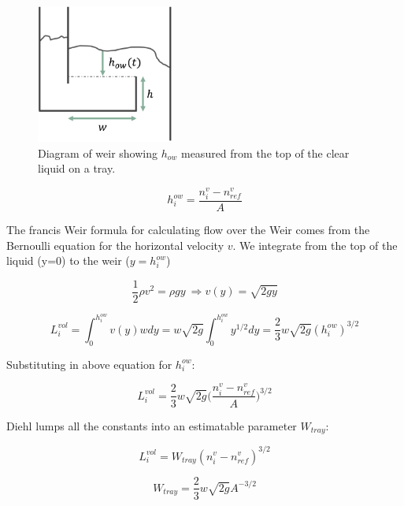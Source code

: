 \begin{figure}
    \centering
    \includegraphics[width=0.4\textwidth]{gfx/Chapter06/weir.png}
    \caption{Diagram of weir showing $h_{ow}$ measured from the top of the clear liquid on a tray.}
    \label{fig:weir}
\end{figure}


\begin{equation}
    h^{ow}_i = \frac{n^v_i-n^v_{ref}}{A}
\end{equation}

The francis Weir formula for calculating flow over the Weir comes from the Bernoulli equation for the horizontal velocity $v$. We integrate from the top of the liquid (y=0) to the weir ($y=h_i^{ow}$)

\begin{equation}
    \frac{1}{2} \rho v^2 = \rho g y \ \Longrightarrow v(y) = \sqrt{2gy}
\end{equation}

\begin{equation}
    L_i^{vol} = \int_0^{h_i^{ow}} v(y)wdy = w\sqrt{2g}\int_0^{h_i^{ow}} y^{1/2}dy = \frac{2}{3}w\sqrt{2g}(h_i^{ow})^{3/2} 
\end{equation}


Substituting in above equation for  $h_i^{ow}$:

\begin{equation}
   L_i^{vol} = \frac{2}{3} w\sqrt{2g}\biggl(\frac{n^v_i-n^v_{ref}}{A}\biggr)^{3/2}  
\end{equation}

Diehl lumps all the constants into an estimatable parameter $W_{tray}$:

\begin{equation}
    L_i^{vol} = W_{tray}(n_i^v-n^v_{ref})^{3/2}
\end{equation}

\begin{equation}
    W_{tray} = \frac{2}{3}w\sqrt{2g}A^{-3/2}
\end{equation}

